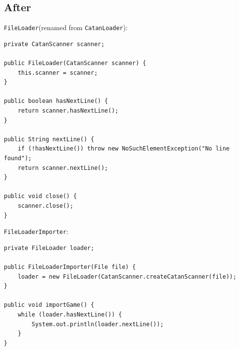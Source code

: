 \documentclass{fank1basedocument}
\begin{document}
\subsection*{After}
\texttt{FileLoader}(renamed from \texttt{CatanLoader}):
\begin{lstlisting}[style=javacode,language=myJava]
private CatanScanner scanner;

public FileLoader(CatanScanner scanner) {
	this.scanner = scanner;
}

public boolean hasNextLine() {
	return scanner.hasNextLine();
}

public String nextLine() {
	if (!hasNextLine()) throw new NoSuchElementException("No line found");
	return scanner.nextLine();
}

public void close() {
	scanner.close();
}
\end{lstlisting}
\texttt{FileLoaderImporter}:
\begin{lstlisting}[style=javacode,language=myJava]
private FileLoader loader;

public FileLoaderImporter(File file) {
	loader = new FileLoader(CatanScanner.createCatanScanner(file));
}

public void importGame() {
	while (loader.hasNextLine()) {
		System.out.println(loader.nextLine());
	}
}
\end{lstlisting}
\end{document}
